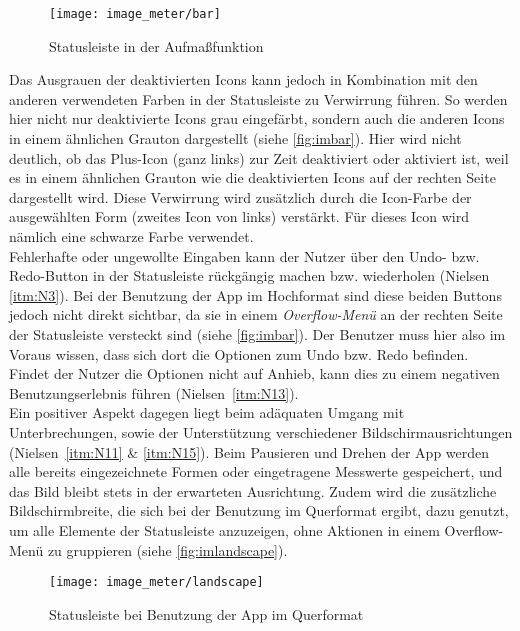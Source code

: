 \begin{wrapfigure}{R}{0.5\textwidth}
  \centering
  \texttt{[image: image\_meter/bar]}
  \caption{Statusleiste in der Aufmaßfunktion}
  \label{fig:imbar}
\end{wrapfigure}

Das Ausgrauen der deaktivierten Icons kann jedoch in Kombination mit den anderen verwendeten Farben in der Statusleiste zu Verwirrung führen.
So werden hier nicht nur deaktivierte Icons grau eingefärbt, sondern auch die anderen Icons in einem ähnlichen Grauton dargestellt (siehe \autoref{fig:imbar}).
Hier wird nicht deutlich, ob das Plus-Icon (ganz links) zur Zeit deaktiviert oder aktiviert ist, weil es in einem ähnlichen Grauton wie die deaktivierten Icons auf der rechten Seite dargestellt wird.
Diese Verwirrung wird zusätzlich durch die Icon-Farbe der ausgewählten Form (zweites Icon von links) verstärkt.
Für dieses Icon wird nämlich eine schwarze Farbe verwendet. \\

Fehlerhafte oder ungewollte Eingaben kann der Nutzer über den Undo- bzw. Redo-Button in der Statusleiste rückgängig machen bzw. wiederholen (Nielsen \autoref{itm:N3}).
Bei der Benutzung der App im Hochformat sind diese beiden Buttons jedoch nicht direkt sichtbar, da sie in einem \emph{Overflow-Menü} an der rechten Seite der Statusleiste versteckt sind (siehe \autoref{fig:imbar}).
Der Benutzer muss hier also im Voraus wissen, dass sich dort die Optionen zum Undo bzw. Redo befinden.
Findet der Nutzer die Optionen nicht auf Anhieb, kann dies zu einem negativen Benutzungserlebnis führen (Nielsen~\autoref{itm:N13}). \\

Ein positiver Aspekt dagegen liegt beim adäquaten Umgang mit Unterbrechungen, sowie der Unterstützung verschiedener Bildschirmausrichtungen (Nielsen~\autoref{itm:N11} \& \autoref{itm:N15}).
Beim Pausieren und Drehen der App werden alle bereits eingezeichnete Formen oder eingetragene Messwerte gespeichert, und das Bild bleibt stets in der erwarteten Ausrichtung.
Zudem wird die zusätzliche Bildschirmbreite, die sich bei der Benutzung im Querformat ergibt, dazu genutzt, um alle Elemente der Statusleiste anzuzeigen, ohne Aktionen in einem Overflow-Menü zu gruppieren (siehe \autoref{fig:imlandscape}).

\begin{figure}[h]
  \centering
  \texttt{[image: image\_meter/landscape]}
  \caption{Statusleiste bei Benutzung der App im Querformat}
  \label{fig:imlandscape}
\end{figure}

